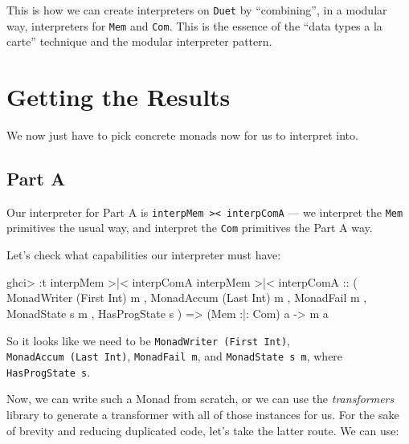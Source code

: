 \documentclass[]{article}
\newenvironment{Shaded}{}{}
\newcommand{\DataTypeTok}[1]{\textcolor[rgb]{0.56,0.13,0.00}{#1}}
\newcommand{\NormalTok}[1]{#1}
\newcommand{\OperatorTok}[1]{\textcolor[rgb]{0.40,0.40,0.40}{#1}}
\newcommand{\OtherTok}[1]{\textcolor[rgb]{0.00,0.44,0.13}{#1}}
\begin{document}
This is how we can create interpreters on \texttt{Duet} by ``combining'', in a
modular way, interpreters for \texttt{Mem} and \texttt{Com}. This is the essence
of the ``data types a la carte'' technique and the modular interpreter pattern.

\section{Getting the Results}\label{getting-the-results}

We now just have to pick concrete monads now for us to interpret into.

\subsection{Part A}\label{part-a}

Our interpreter for Part A is
\texttt{interpMem\ \textgreater{}\textbar{}\textless{}\ interpComA} --- we
interpret the \texttt{Mem} primitives the usual way, and interpret the
\texttt{Com} primitives the Part A way.

Let's check what capabilities our interpreter must have:

\begin{Shaded}
\begin{Highlighting}[]
\NormalTok{ghci}\OperatorTok{\textgreater{}} \OperatorTok{:}\NormalTok{t interpMem }\OperatorTok{\textgreater{}|\textless{}}\NormalTok{ interpComA}
\NormalTok{interpMem }\OperatorTok{\textgreater{}|\textless{}}\NormalTok{ interpComA}
\OtherTok{    ::}\NormalTok{ ( }\DataTypeTok{MonadWriter}\NormalTok{ (}\DataTypeTok{First} \DataTypeTok{Int}\NormalTok{) m}
\NormalTok{       , }\DataTypeTok{MonadAccum}\NormalTok{ (}\DataTypeTok{Last} \DataTypeTok{Int}\NormalTok{) m}
\NormalTok{       , }\DataTypeTok{MonadFail}\NormalTok{ m}
\NormalTok{       , }\DataTypeTok{MonadState}\NormalTok{ s m}
\NormalTok{       , }\DataTypeTok{HasProgState}\NormalTok{ s}
\NormalTok{       )}
    \OtherTok{=\textgreater{}}\NormalTok{ (}\DataTypeTok{Mem} \OperatorTok{:|:} \DataTypeTok{Com}\NormalTok{) a}
    \OtherTok{{-}\textgreater{}}\NormalTok{ m a}
\end{Highlighting}
\end{Shaded}

So it looks like we need to be \texttt{MonadWriter\ (First\ Int)},
\texttt{MonadAccum\ (Last\ Int)}, \texttt{MonadFail\ m}, and
\texttt{MonadState\ s\ m}, where \texttt{HasProgState\ s}.

Now, we can write such a Monad from scratch, or we can use the
\emph{transformers} library to generate a transformer with all of those
instances for us. For the sake of brevity and reducing duplicated code, let's
take the latter route. We can use:
\end{document}
